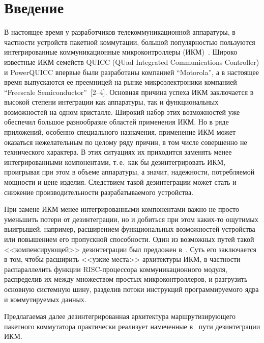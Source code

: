       \begin{multicols}{2}

      \label{st\stat}
      
\section{Введение}

    В настоящее время у разработчиков телекоммуникационной аппаратуры, в частности
устройств пакетной коммутации, большой популярностью пользуются интегрированные
коммуникационные микроконтроллеры (ИКМ)~\cite{1sok}. Широко известные ИКМ семейств
QUICC (QUad Integrated Communications
Controller) и PowerQUICC впервые были разработаны компанией ``Motorola'', а в настоящее время
выпускаются ее преемницей на рынке микроэлектроники компанией
``Freescale Semiconductor''~[2--4]. Основная причина успеха ИКМ заключается в высокой
степени интеграции как аппаратуры, так и функциональных возможностей на одном кристалле.
Широкий набор этих возможностей уже обеспечил большое разнообразие областей применения
ИКМ. Но в ряде приложений, особенно специального назначения, применение ИКМ может
оказаться нежелательным по целому ряду причин, в том числе совершенно не технического
характера. В этих ситуациях их приходится заменять менее интегрированными компонентами,
т.\,е.\ как бы дезинтегрировать ИКМ, проигрывая при этом в объеме аппаратуры, а значит,
надежности, потребляемой мощности и цене изделия. Следствием такой дезинтеграции может
стать и снижение производительности разрабатываемого устройства.

    При замене ИКМ менее интегрированными компонентами важно не просто уменьшить
потери от дезинтеграции, но и добиться при этом каких-то ощутимых выигрышей, например,
расширением функциональных возможностей устройства или повышением его пропускной
спо\-соб\-ности. Один из возможных путей такой <<ком\-пен\-си\-ру\-ющей>> дезинтеграции был
предложен в~\cite{5sok}. Суть его заключается в том, чтобы расширить <<узкие места>>
архитектуры ИКМ, в частности распараллелить функции RISC-про\-цес\-со\-ра коммуникационного
модуля, распределив их между множеством простых мик\-ро\-кон\-т\-рол\-ле\-ров, и разгрузить
основную системную \mbox{шину,} %
разде\-лив потоки инструкций программируемого ядра и
коммутируемых данных.

    Предлагаемая далее дезинтегрированная архитектура маршрутизирующего пакетного
коммутатора практически реализует намеченные в~\cite{5sok} пути дезинтеграции ИКМ.



\end{multicols}
